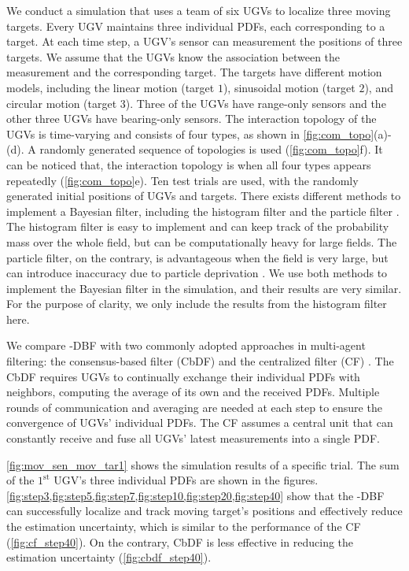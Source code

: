 	We conduct a simulation that uses a team of six UGVs to localize three moving targets.
	Every UGV maintains three individual PDFs, each corresponding to a target.
	At each time step, a UGV's sensor can measurement the positions of three targets.
	We assume that the UGVs know the association between the measurement and the corresponding target.
	The targets have different motion models, including the linear motion (target $1$), sinusoidal motion (target $2$), and circular motion (target $3$).
	Three of the UGVs have range-only sensors and the other three UGVs have bearing-only sensors.
	The interaction topology of the UGVs is time-varying and consists of four types, as shown in \cref{fig:com_topo}(a)-(d).
	A randomly generated sequence of topologies is used (\cref{fig:com_topo}f).
	It can be noticed that, the interaction topology is {\fc} when all four types appears repeatedly (\cref{fig:com_topo}e).
	\textcolor{\revcol}{
	Ten test trials are used, with the randomly generated initial positions of UGVs and targets.	
	There exists different methods to implement a Bayesian filter, including the histogram filter and the particle filter \cite{thrun2005probabilistic}. 
	The histogram filter is easy to implement and can keep track of the probability mass over the whole field, but can be computationally heavy for large fields.
	The particle filter, on the contrary, is advantageous when the field is very large, but can introduce inaccuracy due to particle deprivation \cite{thrun2005probabilistic}.
	We use both methods to implement the Bayesian filter in the simulation, and their results are very similar. 
	For the purpose of clarity, we only include the results from the histogram filter here.}
	
	\textcolor{\revcol}{We compare \proto-DBF with two commonly adopted approaches in multi-agent filtering: the consensus-based filter (CbDF) \cite{olfati2006belief} and the centralized filter (CF) \cite{veeravalli2012distributed}. 
	The CbDF requires UGVs to continually exchange their individual PDFs with neighbors, computing the average of its own and the received PDFs. 
	Multiple rounds of communication and averaging are needed at each step to ensure the convergence of UGVs' individual PDFs. 
	The CF assumes a central unit that can constantly receive and fuse all UGVs' latest measurements into a single PDF.}
	
	\cref{fig:mov_sen_mov_tar1} shows the simulation results of a specific trial.
	The sum of the $1^\text{st}$ UGV's three individual PDFs are shown in the figures.
	\cref{fig:step3,fig:step5,fig:step7,fig:step10,fig:step20,fig:step40} show that the \proto-DBF can successfully localize and track moving target's positions and effectively reduce the estimation uncertainty, which is similar to the performance of the CF (\cref{fig:cf_step40}).
	On the contrary, CbDF is less effective in reducing the estimation uncertainty (\cref{fig:cbdf_step40}).
	
